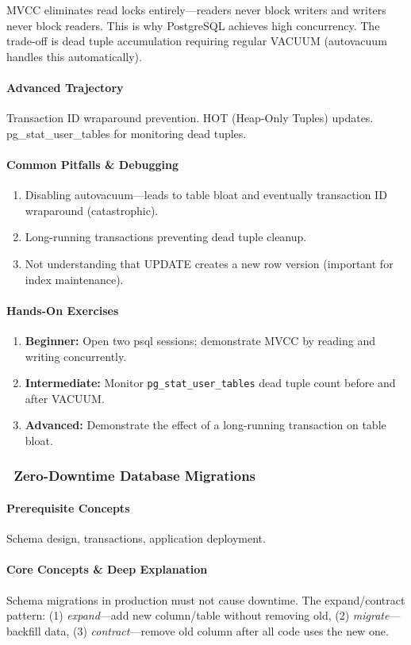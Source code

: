 \documentclass[11pt, a4paper, oneside]{report}
\newcommand{\mustmaster}[1]{\subsubsection{\texorpdfstring{\fcolorbox{blue!40!black}{blue!8}{\footnotesize\bfseries\color{blue!40!black} MUST MASTER}~#1}{#1}}}
\begin{document}
MVCC eliminates read locks entirely---readers never block writers and writers never block readers. This is why PostgreSQL achieves high concurrency. The trade-off is dead tuple accumulation requiring regular VACUUM (autovacuum handles this automatically).

\paragraph{Advanced Trajectory} Transaction ID wraparound prevention. HOT (Heap-Only Tuples) updates. pg\_stat\_user\_tables for monitoring dead tuples.

\paragraph{Common Pitfalls \& Debugging}
\begin{enumerate}[leftmargin=*]
\item Disabling autovacuum---leads to table bloat and eventually transaction ID wraparound (catastrophic).
\item Long-running transactions preventing dead tuple cleanup.
\item Not understanding that UPDATE creates a new row version (important for index maintenance).
\end{enumerate}

\paragraph{Hands-On Exercises}
\begin{enumerate}[leftmargin=*]
\item \textbf{Beginner:} Open two psql sessions; demonstrate MVCC by reading and writing concurrently.
\item \textbf{Intermediate:} Monitor \texttt{pg\_stat\_user\_tables} dead tuple count before and after VACUUM.
\item \textbf{Advanced:} Demonstrate the effect of a long-running transaction on table bloat.
\end{enumerate}

\mustmaster{Zero-Downtime Database Migrations}

\paragraph{Prerequisite Concepts} Schema design, transactions, application deployment.

\paragraph{Core Concepts \& Deep Explanation} Schema migrations in production must not cause downtime. The expand/contract pattern: (1) \emph{expand}---add new column/table without removing old, (2) \emph{migrate}---backfill data, (3) \emph{contract}---remove old column after all code uses the new one.
\end{document}
